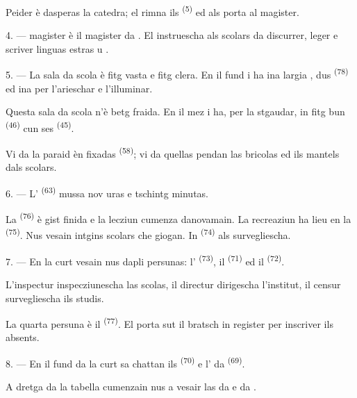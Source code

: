Peider è dasperas la catedra; el rimna ils 
\textsuperscript{(5)} ed als porta al magister.

4. ---  magister è il magister da . El
instruescha als scolars da discurrer, leger e scriver linguas estras
 u .

5. --- La sala da scola è fitg vasta e fitg clera. En il fund i ha ina largia
, dus  \textsuperscript{(78)} ed ina  per l'arieschar e l'illuminar.

Questa sala da scola n'è betg fraida. En il mez i ha, per la stgaudar, in fitg bun
 \textsuperscript{(46)} cun ses  \textsuperscript{(45)}.

Vi da la paraid èn fixadas  \textsuperscript{(58)}; vi
da quellas pendan las bricolas ed ils mantels dals scolars.

\VUsaut{5.2mm}
\VUsaut{3.6mm}

6. --- L' \textsuperscript{(63)} mussa nov uras e tschintg minutas.

La  \textsuperscript{(76)} è gist finida e la lecziun cumenza
danovamain. La recreaziun ha lieu en la  \textsuperscript{(75)}. Nus
vesain intgins scolars che giogan. In  \textsuperscript{(74)}
als survegliescha.

7. --- En la curt vesain nus dapli persunas: l'
\textsuperscript{(73)}, il  \textsuperscript{(71)} ed il
 \textsuperscript{(72)}.

L'inspectur inspecziunescha las scolas, il directur dirigescha l'institut, il
censur survegliescha ils studis.

La quarta persuna è il  \textsuperscript{(77)}. El porta sut il
bratsch in register per inscriver ils absents.

8. --- En il fund da la curt sa chattan ils 
\textsuperscript{(70)} e l' da 
\textsuperscript{(69)}.

A dretga da la tabella cumenzain nus a vesair las  da 
e da .

